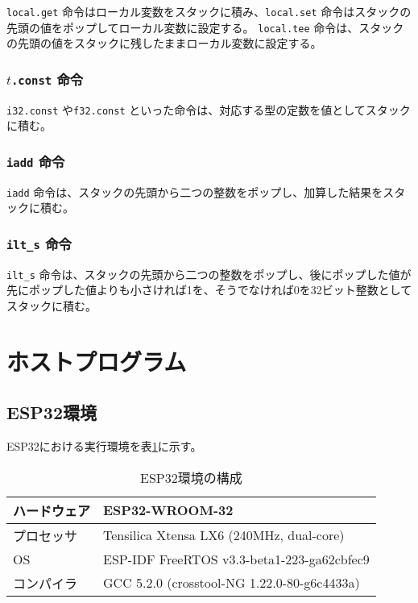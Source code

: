 {\tt local.get} 命令はローカル変数をスタックに積み、{\tt local.set} 命令はスタックの先頭の値をポップしてローカル変数に設定する。
{\tt local.tee} 命令は、スタックの先頭の値をスタックに残したままローカル変数に設定する。

\subsubsection{$t${\tt .const} 命令}

{\tt i32.const} や{\tt f32.const} といった命令は、対応する型の定数を値としてスタックに積む。

\subsubsection{{\tt iadd} 命令}

{\tt iadd} 命令は、スタックの先頭から二つの整数をポップし、加算した結果をスタックに積む。

\subsubsection{{\tt ilt\_s} 命令}

{\tt ilt\_s} 命令は、スタックの先頭から二つの整数をポップし、後にポップした値が先にポップした値よりも小さければ1を、そうでなければ0を32ビット整数としてスタックに積む。

\section{ホストプログラム}

\subsection{ESP32環境}

ESP32における実行環境を表\ref{tab:esp_spec}に示す。

\begin{table}[htbp]
  \label{tab:esp_spec}
  \caption{ESP32環境の構成}
  \begin{center}
    \begin{tabular}{|l|l|}
    \hline
    ハードウェア & ESP32-WROOM-32 \\ \hline
    プロセッサ & Tensilica Xtensa LX6 (240MHz, dual-core) \\ \hline
    OS & ESP-IDF FreeRTOS v3.3-beta1-223-ga62cbfec9 \\ \hline
    コンパイラ & GCC 5.2.0 (crosstool-NG 1.22.0-80-g6c4433a) \\ \hline
    \end{tabular}
  \end{center}
\end{table}

